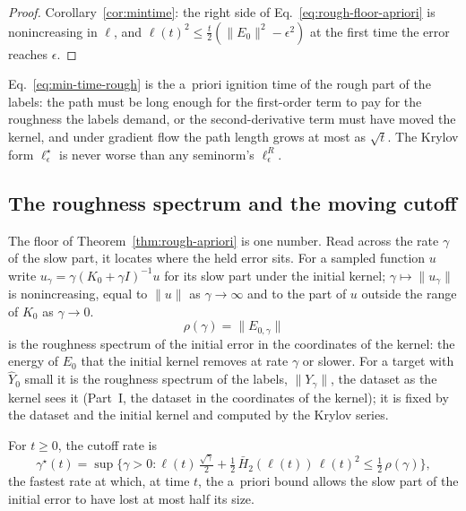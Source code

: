\begin{proof}
Corollary~\ref{cor:mintime}: the right side of
Eq.~\eqref{eq:rough-floor-apriori} is nonincreasing in $\ell$, and
$\ell(t)^2\le\tfrac t2(\|E_0\|^2-\epsilon^2)$ at the first time the error
reaches $\epsilon$.
\end{proof}

Eq.~\eqref{eq:min-time-rough} is the a~priori ignition time of the rough part
of the labels: the path must be long enough for the first-order term to pay
for the roughness the labels demand, or the second-derivative term must have
moved the kernel, and under gradient flow the path length grows at most as
$\sqrt{t}$. The Krylov form $\ell_\epsilon^\star$ is never worse than any
seminorm's $\ell_\epsilon^R$.

\subsection{The roughness spectrum and the moving cutoff}
\label{ssec:hr-cutoff}

The floor of Theorem~\ref{thm:rough-apriori} is one number. Read across the
rate $\gamma$ of the slow part, it locates where the held error sits. For a
sampled function $u$ write $u_\gamma=\gamma(K_0+\gamma I)^{-1}u$ for its slow
part under the initial kernel; $\gamma\mapsto\|u_\gamma\|$ is nonincreasing,
equal to $\|u\|$ as $\gamma\to\infty$ and to the part of $u$ outside the range
of $K_0$ as $\gamma\to0$.
\begin{equation}
\rho(\gamma) = \|E_{0,\gamma}\|
\label{eq:rough-spectrum}
\end{equation}
is the roughness spectrum of the initial error in the coordinates of the
kernel: the energy of $E_0$ that the initial kernel removes at rate $\gamma$
or slower. For a target with $\hat Y_0$ small it is the roughness spectrum of
the labels, $\|Y_\gamma\|$, the dataset as the kernel sees it
(Part~I, the dataset in the coordinates of the kernel); it is fixed by the
dataset and the initial kernel and computed by the Krylov series.

\begin{definition}
\label{def:cutoff}
For $t\ge0$, the cutoff rate is
\begin{equation}
\gamma^\star(t) = \sup\Big\{\gamma>0 : \ell(t)\,\tfrac{\sqrt\gamma}{2}+\tfrac12\,\bar H_2(\ell(t))\,\ell(t)^2 \le \tfrac12\,\rho(\gamma)\Big\},
\label{eq:cutoff}
\end{equation}
the fastest rate at which, at time $t$, the a~priori bound allows the slow
part of the initial error to have lost at most half its size.
\end{definition}

